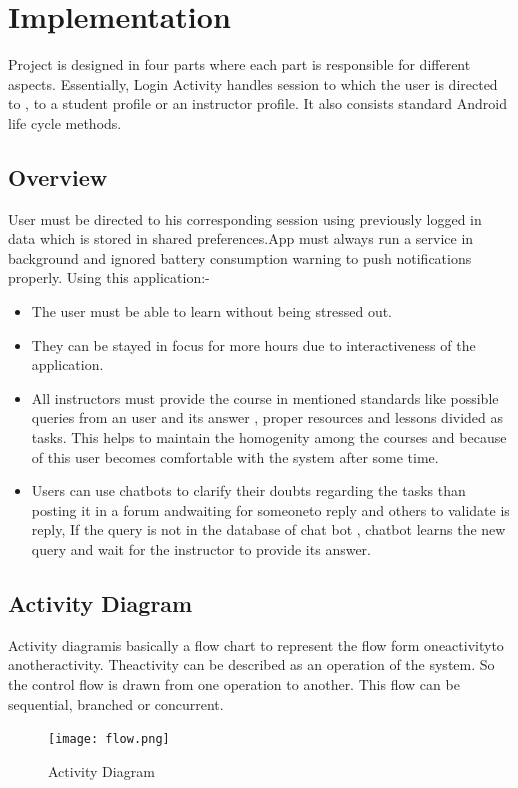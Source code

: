 \newpage
\section{Implementation}

Project is designed in four parts where each part is responsible for different aspects. Essentially, Login Activity handles session to which the user is directed to , to a student profile or an instructor profile. It also consists standard Android life cycle methods.
\subsection{Overview}
User must be directed to his corresponding session using previously logged in data which is stored in shared preferences.App must always run a service in background and ignored battery consumption warning to push notifications properly.
Using this application:-
\begin{itemize}	
\item{The user must be able to learn without being stressed out.}

\item{They can be stayed in focus for more hours due to interactiveness of the application.}

\item{All instructors must provide the course in mentioned standards like possible queries from an user and its answer , proper resources and lessons divided as tasks. This helps to maintain the homogenity among the courses and because of this user becomes comfortable with the system after some time.}

\item{Users can use chatbots to clarify their doubts regarding the tasks than posting it in a forum andwaiting for someoneto reply and others to validate is reply, If the query is not in the database of chat bot , chatbot learns the new query  and wait for the instructor to provide its answer.}

\end{itemize}




\subsection{Activity Diagram}
Activity diagramis basically a flow chart to represent the flow form oneactivityto anotheractivity. Theactivity can be described as an operation of the system. So the control flow is drawn from one operation to another. This flow can be sequential, branched or concurrent.
\begin{figure}[h]
	\label{ss}    %
	\centering
	\texttt{[image: flow.png]}
	\caption{Activity Diagram}
\end{figure}

